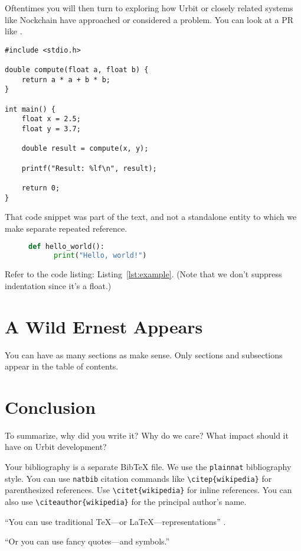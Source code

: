 \documentclass[twoside]{article}
\begin{document}
Oftentimes you will then turn to exploring how Urbit or closely related systems like Nockchain have approached or considered a problem.  You can look at a PR like .

\lstset{language=C}
\begin{lstlisting}
#include <stdio.h>

double compute(float a, float b) {
    return a * a + b * b;
}

int main() {
    float x = 2.5;
    float y = 3.7;

    double result = compute(x, y);

    printf("Result: %lf\n", result);

    return 0;
}
\end{lstlisting}

\noindent
That code snippet was part of the text, and not a standalone entity to which we make separate repeated reference.

\begin{figure}
  \begin{lstlisting}[language=Python, caption={Example Python Code}, label={lst:example}]
  def hello_world():
      print("Hello, world!")
  \end{lstlisting}
\end{figure}

Refer to the code listing: Listing~\ref{lst:example}.  (Note that we don't suppress indentation since it's a float.)


\section{A Wild Ernest Appears}

You can have as many sections as make sense.  Only sections and subsections appear in the table of contents.

\section{Conclusion}

To summarize, why did you write it?  Why do we care?  What impact should it have on Urbit development?

Your bibliography is a separate BibTeX file.  We use the \texttt{plainnat} bibliography style.  You can use \texttt{natbib} citation commands like \texttt{\textbackslash citep\{wikipedia\}} for parenthesized references.  Use \texttt{\textbackslash citet\{wikipedia\}} for inline references.  You can also use \texttt{\textbackslash citeauthor\{wikipedia\}} for the principal author's name.

``You can use traditional TeX---or LaTeX---representations'' \citep{Varney1987}.

“Or you can use fancy quotes—and symbols.”

\printbibliography
\end{document}
